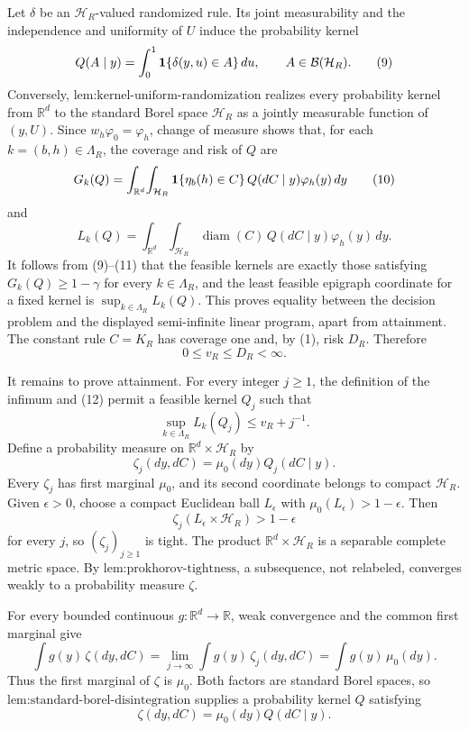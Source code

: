 Let \(\delta\) be an \(\mathcal H_R\)-valued randomized rule.  Its joint measurability and the independence and uniformity of \(U\) induce the probability kernel
\[
 Q(A\mid y)=\int_0^1{\bf1}\{\delta(y,u)\in A\}\,du,
 \qquad A\in\mathcal B(\mathcal H_R).
\tag{9}
\]
Conversely, \(\text{lem:kernel-uniform-randomization}\) realizes every probability kernel from \(\mathbb R^d\) to the standard Borel space \(\mathcal H_R\) as a jointly measurable function of \((y,U)\).  Since \(w_h\varphi_0=\varphi_h\), change of measure shows that, for each \(k=(b,h)\in\Lambda_R\), the coverage and risk of \(Q\) are
\[
 G_k(Q)=\int_{\mathbb R^d}\!\int_{\mathcal H_R}
 {\bf1}\{\eta_b(h)\in C\}\,Q(dC\mid y)\varphi_h(y)\,dy
\tag{10}
\]
and
\[
 L_k(Q)=\int_{\mathbb R^d}\!\int_{\mathcal H_R}
 \operatorname{diam}(C)\,Q(dC\mid y)\varphi_h(y)\,dy.
\tag{11}
\]
It follows from (9)--(11) that the feasible kernels are exactly those satisfying \(G_k(Q)\ge1-\gamma\) for every \(k\in\Lambda_R\), and the least feasible epigraph coordinate for a fixed kernel is \(\sup_{k\in\Lambda_R}L_k(Q)\).  This proves equality between the decision problem and the displayed semi-infinite linear program, apart from attainment.  The constant rule \(C=K_R\) has coverage one and, by (1), risk \(D_R\).  Therefore
\[
 0\le v_R\le D_R<\infty.
\tag{12}
\]

It remains to prove attainment.  For every integer \(j\ge1\), the definition of the infimum and (12) permit a feasible kernel \(Q_j\) such that
\[
 \sup_{k\in\Lambda_R}L_k(Q_j)\le v_R+j^{-1}.
\tag{13}
\]
Define a probability measure on \(\mathbb R^d\times\mathcal H_R\) by
\[
 \zeta_j(dy,dC)=\mu_0(dy)Q_j(dC\mid y).
\tag{14}
\]
Every \(\zeta_j\) has first marginal \(\mu_0\), and its second coordinate belongs to compact \(\mathcal H_R\).  Given \(\epsilon>0\), choose a compact Euclidean ball \(L_\epsilon\) with \(\mu_0(L_\epsilon)>1-\epsilon\).  Then
\[
 \zeta_j(L_\epsilon\times\mathcal H_R)>1-\epsilon
\tag{15}
\]
for every \(j\), so \((\zeta_j)_{j\ge1}\) is tight.  The product \(\mathbb R^d\times\mathcal H_R\) is a separable complete metric space.  By \(\text{lem:prokhorov-tightness}\), a subsequence, not relabeled, converges weakly to a probability measure \(\zeta\).

For every bounded continuous \(g:\mathbb R^d\to\mathbb R\), weak convergence and the common first marginal give
\[
 \int g(y)\,\zeta(dy,dC)
 =\lim_{j\to\infty}\int g(y)\,\zeta_j(dy,dC)
 =\int g(y)\,\mu_0(dy).
\tag{16}
\]
Thus the first marginal of \(\zeta\) is \(\mu_0\).  Both factors are standard Borel spaces, so \(\text{lem:standard-borel-disintegration}\) supplies a probability kernel \(Q\) satisfying
\[
 \zeta(dy,dC)=\mu_0(dy)Q(dC\mid y).
\tag{17}
\]

